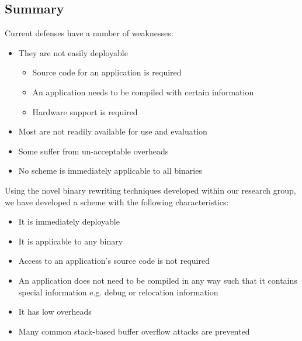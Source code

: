 
\subsection{Summary}

Current defenses have a number of weaknesses:

\begin{itemize}

\item They are not easily deployable

  \begin{itemize}
  \item Source code for an application is required
  \item An application needs to be compiled with certain information
  \item Hardware support is required
  \end{itemize}

\item Most are not readily available for use and evaluation

\item Some suffer from un-acceptable overheads

\item No scheme is immediately applicable to all binaries

\end{itemize}

Using the novel binary rewriting techniques developed within our research group, we have developed a scheme with the following characteristics:

\begin{itemize}

\item It is immediately deployable

\item It is applicable to any binary

\item Access to an application's source code is not required

\item An application does not need to be compiled in any way such that it contains special information e.g. debug or relocation information

\item It has low overheads

\item Many common stack-based buffer overflow attacks are prevented

\end{itemize}
